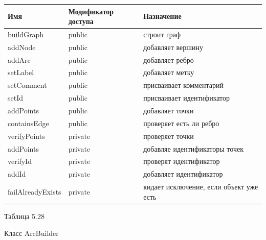 \documentclass{../TechDoc}
\begin{document}
	\begin{tabular}{|p{5cm}|p{5cm}|p{5cm}|}
		\hline
		\textbf{Имя} & \textbf{Модификатор доступа} & \textbf{Назначение} \\
		\hline
		buildGraph& public & строит граф\\
		\hline
		addNode& public& добавляет вершину\\
		\hline
		addArc& public& добавляет ребро\\
		\hline
		setLabel& public& добавляет метку\\
		\hline
		setComment& public& присваивает комментарий\\
		\hline
		setId& public& присваивает идентификатор\\
		\hline
		addPoints&public & добавляет точки\\
		\hline
		containsEdge& public& проверяет есть ли ребро\\
		\hline
		verifyPoints& private& проверяет точки\\
		\hline
		addPoints& private& добавляе идентификаторы точек\\
		\hline
		verifyId& private& проверят идентификатор\\
		\hline
		addId& private& добавляет идентификатор\\
		\hline
		failAlreadyExists& private& кидает исключение, если объект уже есть\\
		\hline
	\end{tabular}
	\begin{flushright}
		Таблица 5.28
	\end{flushright}
	Класс ArcBuilder
	
\end{document}
